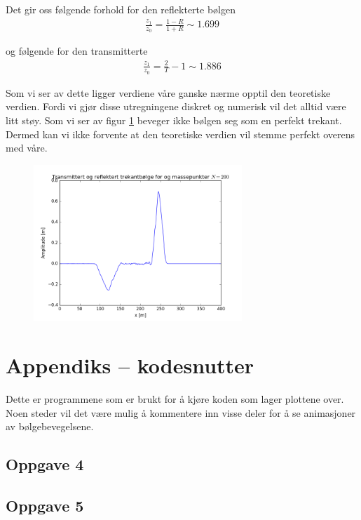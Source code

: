 \documentclass[norsk,a4,12pt,fleqn]{extarticle}
\begin{document}
Det gir oss følgende forhold for
den reflekterte bølgen
\begin{align}
    \frac{z_1}{z_0} = \frac{1-R}{1+R} \sim 1.699
\end{align}
    
og følgende for den transmitterte 
\begin{align}
    \frac{z_1}{z_0} = \frac{2}{T} - 1 \sim 1.886
\end{align}

Som vi ser av dette ligger verdiene våre ganske
nærme opptil den teoretiske verdien.
Fordi vi gjør disse utregningene diskret og
numerisk vil det alltid være litt støy.
Som vi ser av figur \ref{fig:prob9} beveger
ikke bølgen seg som en perfekt trekant.
Dermed kan vi ikke forvente at den teoretiske
verdien vil stemme perfekt overens med våre.
\begin{figure}[H]
    \label{fig:prob9}
    \centering %
    \includegraphics[width=0.7\textwidth]{../src/problem9.png}
    \caption{} 
\end{figure} 


\section*{Appendiks – kodesnutter}
Dette er programmene som er brukt for å kjøre koden som lager plottene over.
Noen steder vil det være mulig å kommentere inn visse deler for
å se animasjoner av bølgebevegelsene.
\subsection*{Oppgave 4}

\newpage
\subsection*{Oppgave 5}

\newpage
\end{document}
